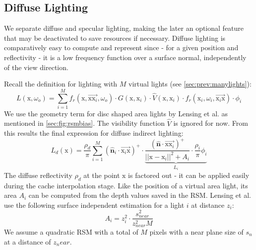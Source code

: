 \documentclass[thesis.tex]{subfiles}
\begin{document}
\subsection{Diffuse Lighting} \label{sec:impl:diffuse}
We separate diffuse and specular lighting, making the later an optional feature that may be deactivated to save resources if necessary.
Diffuse lighting is comparatively easy to compute and represent since - for a given position and reflectivity - it is a low frequency function over a surface normal, independently of the view direction.


Recall the definition for lighting with $M$ virtual lights (see \autoref{sec:prev:manylights}):
\begin{equation}
L(\mathrm{x}, \omega_o) = \sum\limits_{i=1}^{M} f_r(\mathrm{x}, \overrightarrow{\mathrm{x}\mathrm{x}_i}, \omega_o) \cdot G(\mathrm{x}, \mathrm{x}_i) \cdot \hat{V}(\mathrm{x}, \mathrm{x}_i) \cdot f_r(\mathrm{x}_i, \omega_i, \overrightarrow{\mathrm{x}_i\mathrm{x}}) \cdot \phi_i
\end{equation}
We use the geometry term for disc shaped area lights by Lensing et al. \cite{bib:LightskinPaper} as mentioned in \autoref{sec:fig:rsmbias}.
The visibility function $\hat{V}$ is ignored for now.
From this results the final expression for diffuse indirect lighting:
\begin{equation}
L_d (\mathrm{x}) = \frac{\rho_d}{\pi} \sum\limits_{i=1}^{M} 
(\hat{\mathbf{n}}_i\cdot \overrightarrow{\mathrm{x}_i\mathrm{x}})^+ \cdot
\underbrace{\frac{(\hat{\mathbf{n}} \cdot \overrightarrow{\mathrm{x}\mathrm{x}_i} )^+}{||\mathrm{x} - \mathrm{x}_i||^2 + A_i} \cdot  \frac{\rho_i}{\pi} \phi_i}_{L_i}
\end{equation}
The diffuse reflectivity $\rho_d$ at the point $\mathrm{x}$ is factored out - it can be applied easily during the cache interpolation stage.
Like the position of a virtual area light, its area $A_i$ can be computed from the depth values saved in the RSM.
Lensing et al. \cite{bib:LightskinPaper} use the following surface independent estimation for a light $i$ at distance $z_i$:
\begin{equation}
A_i = z_i^2 \cdot \frac{s_{near}^2}{z_{near}^2 M}
\end{equation}
We assume a quadratic RSM with a total of $M$ pixels with a near plane size of $s_n$ at a distance of $z_near$.
\end{document}
